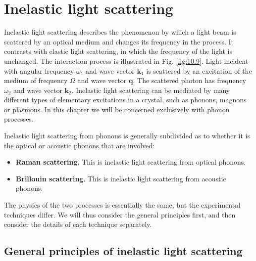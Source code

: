 \documentclass[12pt]{book}
\begin{document}
\section{Inelastic light scattering}

Inelastic light scattering describes the phenomenon by which a light beam is scattered by an optical medium and changes its frequency in the process. It contrasts with elastic light scattering, in which the frequency of the light is unchanged. The interaction process is illustrated in Fig. \ref{fig:10.9}. Light incident with angular frequency $\omega_1$ and wave vector $\mathbf{k}_1$ is scattered by an excitation of the medium of frequency $\Omega$ and wave vector $\mathbf{q}$. The scattered photon has frequency $\omega_2$ and wave vector $\mathbf{k}_2$. Inelastic light scattering can be mediated by many different types of elementary excitations in a crystal, such as phonons, magnons or plasmons. In this chapter we will be concerned exclusively with phonon processes.

Inelastic light scattering from phonons is generally subdivided as to whether it is the optical or acoustic phonons that are involved:
\begin{itemize}
  \item \textbf{Raman scattering}. This is inelastic light scattering from optical phonons.
  \item \textbf{Brillouin scattering}. This is inelastic light scattering from acoustic phonons.
\end{itemize}
The physics of the two processes is essentially the same, but the experimental techniques differ. We will thus consider the general principles first, and then consider the details of each technique separately.

\subsection{General principles of inelastic light scattering}
\end{document}
